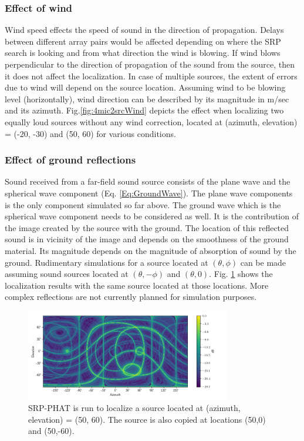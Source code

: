 \subsubsection{Effect of wind}
Wind speed effects the speed of sound in the direction of propagation. Delays between different array pairs would be affected depending on where the SRP search is looking and from what direction the wind is blowing. If wind blows perpendicular to the direction of propagation of the sound from the source, then it does not affect the localization. In case of multiple sources, the extent of errors due to wind will depend on the source location. Assuming wind to be blowing level (horizontally), wind direction can be described by its magnitude in m/sec and its azimuth. Fig.\ref{fig:4mic2srcWind} depicts the effect when localizing two equally loud sources without any wind correction, located at (azimuth, elevation) = (-20, -30) and (50, 60) for various conditions.

\subsubsection{Effect of ground reflections}
Sound received from a far-field sound source consists of the plane wave and the spherical wave component (Eq. \ref{Eq:GroundWave}). The plane wave components is the only component simulated so far above. The ground wave which is the spherical wave component needs to be considered as well. It is the contribution of the image created by the source with the ground. The location of this reflected sound is in vicinity of the image and depends on the smoothness of the ground material. Its magnitude depends on the magnitude of absorption of sound by the ground. Rudimentary simulations for a source located at $(\theta,\phi)$ can be made assuming sound sources located at $(\theta,-\phi)$ and $(\theta,0)$. Fig. \ref{fig:4mic1srcRef} shows the localization results with the same source located at those locations. More complex reflections are not currently planned for simulation purposes.

\begin{figure}[H]
    \centering
    \includegraphics[width=0.8\textwidth]{Figures/Ind4mic1srcSumRef.png}
    \caption{SRP-PHAT is run to localize a source located at (azimuth, elevation) = (50, 60). The source is also copied at locations (50,0) and (50,-60).}
    \label{fig:4mic1srcRef}
\end{figure}